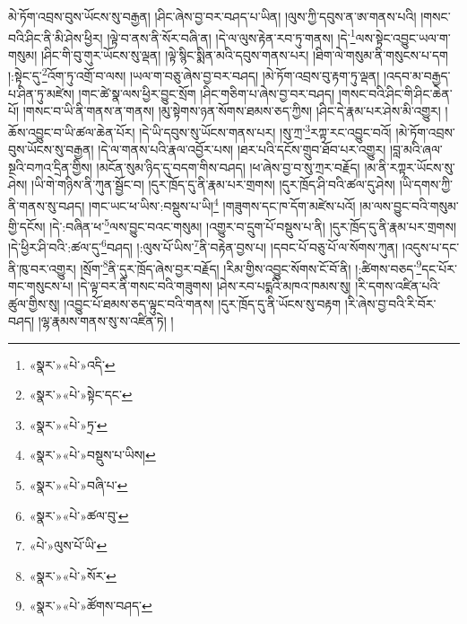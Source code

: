 མེ་ཏོག་འབྲས་བུས་ཡོངས་སུ་བརྒྱན། །ཤིང་ཞེས་བྱ་བར་བཤད་པ་ཡིན། །ལུས་ཀྱི་དབུས་ན་ཨ་གནས་པའི། །གསང་བའི་ཤིང་ནི་མི་ཤེས་ཕྱིར། །ལྟེ་བ་ནས་ནི་སོར་བཞི་ན། །དེ་ལ་ལུས་རྟེན་རབ་ཏུ་གནས། །དེ་\footnote{«སྣར་»«པེ་»འདི་}ལས་སྟེང་འབྱུང་ཡལ་ག་གསུམ། །ཤིང་གི་བུ་གུར་ཡོངས་སུ་ལྡན། །ལྟེ་སྙིང་སྨིན་མའི་དབུས་གནས་པར། །ཐིག་ལེ་གསུམ་ནི་གསུངས་པ་དག །:སྟེང་དུ་\footnote{«སྣར་»«པེ་»སྟེང་དང་}འོག་ཏུ་འགྲོ་བ་ལས། །ཡལ་ག་བཅུ་ཞེས་བྱ་བར་བཤད། །མེ་ཏོག་འབྲས་བུ་རྟག་ཏུ་ལྡན། །འདབ་མ་བརྒྱད་པ་ཤིན་ཏུ་མཛེས། །གང་ཚེ་སྣ་ལས་ཕྱིར་བྱུང་སྲོག །ཤིང་གཅིག་པ་ཞེས་བྱ་བར་བཤད། །གསང་བའི་ཤིང་གི་ཤིང་ཆེན་པོ། །གསང་བ་ཡི་ནི་གནས་ན་གནས། །མུ་སྟེགས་ཉན་སོགས་ཐམས་ཅད་ཀྱིས། །ཤིང་དེ་རྣམ་པར་ཤེས་མི་འགྱུར། །ཆོས་འབྱུང་བ་ཡི་ཚལ་ཆེན་པོར། །དེ་ཡི་དབུས་སུ་ཡོངས་གནས་པར། །སུ་ཀྲ་\footnote{«སྣར་»«པེ་»ཏྲ་}རཀྟ་རང་འབྱུང་བའོ། །མེ་ཏོག་འབྲས་བུས་ཡོངས་སུ་བརྒྱན། །དེ་ལ་གནས་པའི་རྣལ་འབྱོར་པས། །ཐར་པའི་དངོས་གྲུབ་ཐོབ་པར་འགྱུར། །བླ་མའི་ཞལ་སྔའི་བཀའ་དྲིན་གྱིས། །མངོན་སུམ་ཉིད་དུ་བདག་གིས་བཤད། །ཕ་ཞེས་བྱ་བ་སུ་ཀྲར་བརྗོད། །མ་ནི་རཀྟར་ཡོངས་སུ་ཤེས། །ཡི་གེ་གཉིས་ནི་ཀུན་སྦྱོང་བ། །དུར་ཁྲོད་དུ་ནི་རྣམ་པར་གྲགས། །དུར་ཁྲོད་ཤི་བའི་ཚལ་དུ་ཤེས། །ཡི་དགས་ཀྱི་ནི་གནས་སུ་བཤད། །གང་ཡང་ཕ་ཡིས་:བསྡུས་པ་ཡི།\footnote{«སྣར་»«པེ་»བསྡུས་པ་ཡིས།} །གཟུགས་དང་ཁ་དོག་མཛེས་པའོ། །མ་ལས་བྱུང་བའི་གསུམ་གྱི་དངོས། །དེ་:བཞིན་ཕ་\footnote{«སྣར་»«པེ་»བཞི་པ་}ལས་བྱུང་བའང་གསུམ། །འགྱུར་བ་དྲུག་པོ་བསྡུས་པ་ནི། །དུར་ཁྲོད་དུ་ནི་རྣམ་པར་གྲགས། །དེ་ཕྱིར་ཤི་བའི་:ཚལ་དུ་\footnote{«སྣར་»«པེ་»ཚལ་བུ་}བཤད། །:ལུས་པོ་ཡིས་\footnote{«པེ་»ལུས་པོ་ཡི་}ནི་བརྟེན་བྱས་པ། །དབང་པོ་བཅུ་པོ་ལ་སོགས་ཀུན། །འདུས་པ་དང་ནི་ཁུ་བར་འགྱུར། །སྲོག་\footnote{«སྣར་»«པེ་»སོར་}ནི་དུར་ཁྲོད་ཞེས་བྱར་བརྗོད། །རིམ་གྱིས་འབྱུང་སོགས་ངོ་བོ་ནི། །:ཚིགས་བཅད་\footnote{«སྣར་»«པེ་»ཚོགས་བཤད་}དང་པོར་གང་གསུངས་པ། །དེ་ལྟ་བར་ནི་གསང་བའི་གཟུགས། །ཤེས་རབ་པདྨའི་མཁའ་ཁམས་སུ། །རི་དགས་འཛིན་པའི་ཚུལ་གྱིས་སུ། །འབྱུང་པོ་ཐམས་ཅད་ལྟུང་བའི་གནས། །དུར་ཁྲོད་དུ་ནི་ཡོངས་སུ་བརྟག །རི་ཞེས་བྱ་བའི་རི་བོར་བཤད། །ལྷ་རྣམས་གནས་སུ་ས་འཛིན་ཏེ། །

